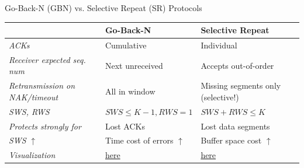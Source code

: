\begin{theorem}
    {Go-Back-N (GBN) vs. Selective Repeat (SR) Protocols}

    \begin{tabular}{l|l|l}
                                               & \textbf{Go-Back-N}                                                                                                                   & \textbf{Selective Repeat}                                                                                                                   \\
        \hline
        \textit{ACKs}                          & Cumulative                                                                                                                           & Individual                                                                                                                                  \\
        \textit{Receiver expected seq. num}    & Next unreceived                                                                                                                      & Accepts out-of-order                                                                                                                        \\
        \textit{Retransmission on NAK/timeout} & All in window                                                                                                                        & Missing segments only (selective!)                                                                                                          \\
        \textit{SWS, RWS}                      & $SWS \leq K-1, RWS = 1$                                                                                                              & $SWS + RWS \leq K$                                                                                                                          \\
        \textit{Protects strongly for}         & Lost ACKs                                                                                                                            & Lost data segments                                                                                                                          \\
        \textit{SWS} $\uparrow$                & Time cost of errors $\uparrow$                                                                                                       & Buffer space cost $\uparrow$                                                                                                                \\
        \textit{Visualization}                 & \href{https://media.pearsoncmg.com/aw/ecs_kurose_compnetwork_7/cw/content/interactiveanimations/go-back-n-protocol/index.html}{here} & \href{https://media.pearsoncmg.com/aw/ecs_kurose_compnetwork_7/cw/content/interactiveanimations/selective-repeat-protocol/index.html}{here} \\
    \end{tabular}
\end{theorem}

